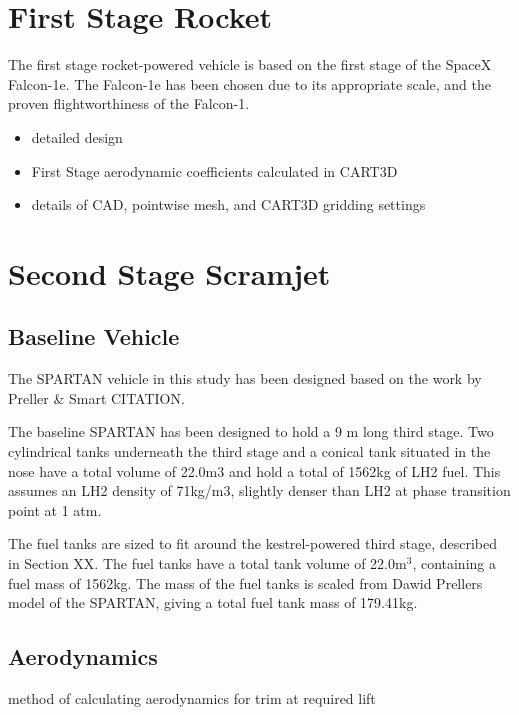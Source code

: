 \section{First Stage Rocket}
The first stage rocket-powered vehicle is based on the first stage of the SpaceX Falcon-1e. The Falcon-1e has been chosen due to its appropriate scale, and the proven flightworthiness of the Falcon-1.

\begin{itemize}
	\item detailed design
	\item First Stage aerodynamic coefficients calculated in CART3D
	\item details of CAD, pointwise mesh, and CART3D gridding settings
\end{itemize}
	
	
	\section{Second Stage Scramjet}
		\subsection{Baseline Vehicle}
		The SPARTAN vehicle in this study has been designed based on the work by Preller \& Smart CITATION. 
		
		The baseline SPARTAN has been designed to hold a 9 m long third stage.  Two cylindrical tanks underneath the third stage and a conical tank situated in the nose have a total volume of 22.0m3 and hold a total of 1562kg of LH2 fuel. This assumes an LH2 density of 71kg/m3, slightly denser than LH2 at phase transition point at 1 atm.
		
		
		
		The fuel tanks are sized to fit around the kestrel-powered third stage, described in Section XX. 
The fuel tanks have a total tank volume of 22.0m$^3$, containing a fuel mass of 1562kg.
The mass of the fuel tanks is scaled from Dawid Prellers model of the SPARTAN, giving a total fuel tank mass of 179.41kg.
		
		

		
		
		\subsection{Aerodynamics}
		method of calculating aerodynamics for trim at required lift
		
